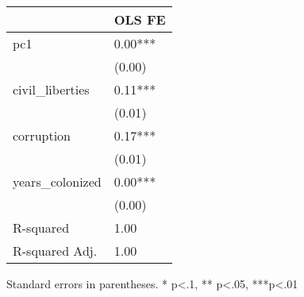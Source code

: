 \begin{table}
\caption{}
\label{}
\begin{center}
\begin{tabular}{ll}
\hline
                 & OLS FE   \\
\hline
pc1              & 0.00***  \\
                 & (0.00)   \\
civil\_liberties & 0.11***  \\
                 & (0.01)   \\
corruption       & 0.17***  \\
                 & (0.01)   \\
years\_colonized & 0.00***  \\
                 & (0.00)   \\
R-squared        & 1.00     \\
R-squared Adj.   & 1.00     \\
\hline
\end{tabular}
\end{center}
\end{table}
\bigskip
Standard errors in parentheses. \newline 
* p<.1, ** p<.05, ***p<.01